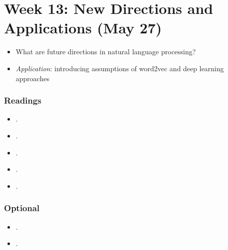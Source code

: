 \documentclass[abstract=on,parskip=full,headings=standardclasses,fontsize=11pt,paper=a4]{scrartcl}
\begin{document}
\section{Week 13: New Directions and Applications (May 27)}


\begin{itemize}
\renewcommand\labelitemi{--}
\item What are future directions in natural language processing?
\item \textit{Application}: introducing assumptions of word2vec and deep learning approaches
\end{itemize}

\subsubsection*{Readings}
\begin{itemize}
\item {}.
\item {}.
\item {}.
\item {}.
\item {}.
\end{itemize}

\subsubsection*{Optional}

\begin{itemize}
\item {}.
\item {}.
\end{itemize}


\sloppy
\renewcommand*{\bibfont}{\small}

\setlength{\bibitemsep}{0.2em} %
\printbibliography

\bigskip

\end{document}
